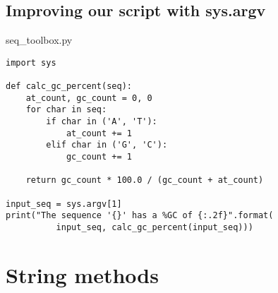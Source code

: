 \documentclass[aspectratio=1610,slidestop]{beamer}
\begin{document}
\subsection{Improving our script with sys.argv}
\begin{pframe}
 \begin{pythonfile}{seq\_toolbox.py}
  \begin{verbatim}
import sys

def calc_gc_percent(seq):
    at_count, gc_count = 0, 0
    for char in seq:
        if char in ('A', 'T'):
            at_count += 1
        elif char in ('G', 'C'):
            gc_count += 1

    return gc_count * 100.0 / (gc_count + at_count)

input_seq = sys.argv[1]
print("The sequence '{}' has a %GC of {:.2f}".format(
          input_seq, calc_gc_percent(input_seq)))
  \end{verbatim}
 \end{pythonfile}
\end{pframe}



\section{String methods}
\end{document}
